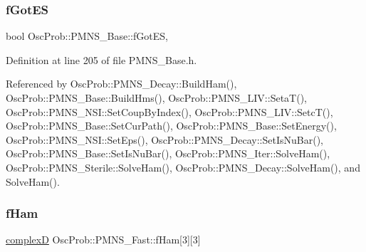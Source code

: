 \mbox{\label{classOscProb_1_1PMNS__Base_a6dc5cd010d2d70b2324745b4e53e9839}} 
\subsubsection{\texorpdfstring{f\+Got\+ES}{fGotES}}
{\footnotesize\ttfamily bool Osc\+Prob\+::\+P\+M\+N\+S\+\_\+\+Base\+::f\+Got\+ES\hspace{0.3cm}{\ttfamily [protected]}, {\ttfamily [inherited]}}



Definition at line 205 of file P\+M\+N\+S\+\_\+\+Base.\+h.



Referenced by Osc\+Prob\+::\+P\+M\+N\+S\+\_\+\+Decay\+::\+Build\+Ham(), Osc\+Prob\+::\+P\+M\+N\+S\+\_\+\+Base\+::\+Build\+Hms(), Osc\+Prob\+::\+P\+M\+N\+S\+\_\+\+L\+I\+V\+::\+Seta\+T(), Osc\+Prob\+::\+P\+M\+N\+S\+\_\+\+N\+S\+I\+::\+Set\+Coup\+By\+Index(), Osc\+Prob\+::\+P\+M\+N\+S\+\_\+\+L\+I\+V\+::\+Setc\+T(), Osc\+Prob\+::\+P\+M\+N\+S\+\_\+\+Base\+::\+Set\+Cur\+Path(), Osc\+Prob\+::\+P\+M\+N\+S\+\_\+\+Base\+::\+Set\+Energy(), Osc\+Prob\+::\+P\+M\+N\+S\+\_\+\+N\+S\+I\+::\+Set\+Eps(), Osc\+Prob\+::\+P\+M\+N\+S\+\_\+\+Decay\+::\+Set\+Is\+Nu\+Bar(), Osc\+Prob\+::\+P\+M\+N\+S\+\_\+\+Base\+::\+Set\+Is\+Nu\+Bar(), Osc\+Prob\+::\+P\+M\+N\+S\+\_\+\+Iter\+::\+Solve\+Ham(), Osc\+Prob\+::\+P\+M\+N\+S\+\_\+\+Sterile\+::\+Solve\+Ham(), Osc\+Prob\+::\+P\+M\+N\+S\+\_\+\+Decay\+::\+Solve\+Ham(), and Solve\+Ham().

\mbox{\label{classOscProb_1_1PMNS__Fast_a94286a881bc53dd512a89d548346b611}} 
\subsubsection{\texorpdfstring{f\+Ham}{fHam}}
{\footnotesize\ttfamily \hyperlink{EigenPoint_8h_a67ca8e107e20610c3fff78d5e726ece0}{complexD} Osc\+Prob\+::\+P\+M\+N\+S\+\_\+\+Fast\+::f\+Ham\mbox{[}3\mbox{]}\mbox{[}3\mbox{]}\hspace{0.3cm}{\ttfamily [protected]}}



